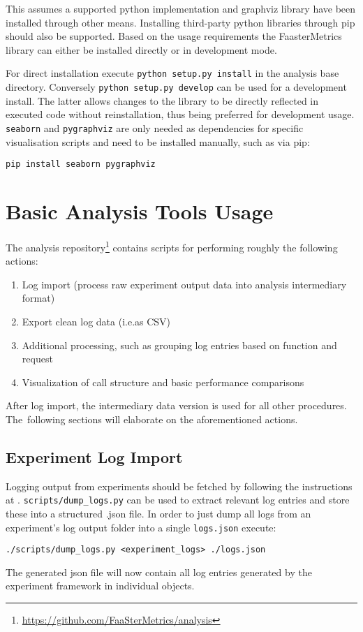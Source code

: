 \documentclass[../main.tex]{subfiles}
\begin{document}
This assumes a supported python implementation and graphviz library have been installed through other means. 
Installing third-party python libraries through pip should also be supported. 
Based on the usage requirements the FaasterMetrics library can either be installed directly or in development mode. 

For direct installation execute \texttt{python setup.py install} in the analysis base directory. 
Conversely \texttt{python setup.py develop} can be used for a development install. 
The latter allows changes to the library to be directly reflected in executed code without reinstallation,
thus being preferred for development usage.
\texttt{seaborn} and \texttt{pygraphviz} are only needed as dependencies for specific visualisation scripts 
and need to be installed manually, such as via pip:
\begin{tcolorbox}
  \texttt{pip install seaborn pygraphviz}
\end{tcolorbox}

\section{Basic Analysis Tools Usage}\label{sec:analysisBasicUsage}

The analysis repository\footnote{\url{https://github.com/FaaSterMetrics/analysis}}
contains scripts for performing roughly the following actions:
\begin{enumerate}
  \item Log import (process raw experiment output data into analysis intermediary format)
  \item Export clean log data (i.e.\@ as CSV)
  \item Additional processing, such as grouping log entries based on function and request
  \item Visualization of call structure and basic performance comparisons
\end{enumerate}
After log import, the intermediary data version is used for all other procedures. 
The~following sections will elaborate on the aforementioned actions.

\subsection{Experiment Log Import}%
\label{sub:analysisUsageLogImport}

Logging output from experiments should be fetched by following the instructions at .
\texttt{scripts/dump\_logs.py} can be used to extract relevant log entries and store these into a structured .json file.
In order to just dump all logs from an experiment's log output folder into a single \texttt{logs.json} execute:
\begin{tcolorbox}
  \texttt{./scripts/dump_logs.py <experiment_logs> ./logs.json}
\end{tcolorbox}\noindent
The generated json file will now contain all log entries generated by the experiment framework in individual objects.
\end{document}
